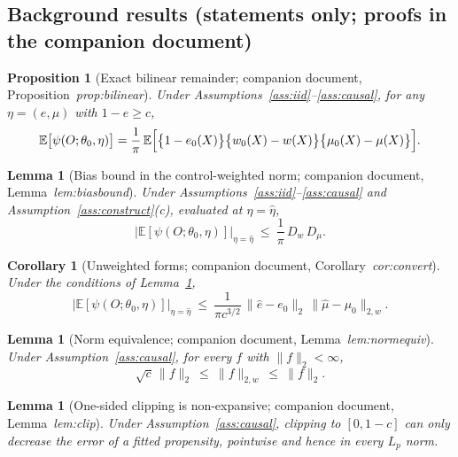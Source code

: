 \documentclass[11pt]{article}
\theoremstyle{plain}
\newtheorem{lemma}[theorem]{Lemma}
\newtheorem{proposition}[theorem]{Proposition}
\newtheorem{corollary}[theorem]{Corollary}
\theoremstyle{definition}
\theoremstyle{remark}
\newcommand{\E}{\mathbb{E}}
\newcommand{\ez}{e_0}
\newcommand{\mz}{\mu_0}
\newcommand{\wz}{w_0}
\newcommand{\ehat}{\widehat{e}}
\newcommand{\mhat}{\widehat{\mu}}
\newcommand{\Dw}{D_w}
\newcommand{\Dm}{D_\mu}
\newcommand{\Ltwo}[1]{\lVert #1 \rVert_{2}}
\newcommand{\Lw}[1]{\lVert #1 \rVert_{2,w}}
\begin{document}
\subsection{Background results (statements only; proofs in the companion document)}\label{sec:background-results}

\begin{proposition}[Exact bilinear remainder; companion document,
Proposition~\emph{prop:bilinear}]\label{prop:bilinear}
Under Assumptions~\ref{ass:iid}--\ref{ass:causal}, for any $\eta=(e,\mu)$
with $1-e\ge c$,
\begin{equation}\label{eq:bilinear}
  \E\bigl[\psi(O;\theta_0,\eta)\bigr]
  =\frac1\pi\,\E\Bigl[\bigl\{1-\ez(X)\bigr\}
   \bigl\{\wz(X)-w(X)\bigr\}\bigl\{\mz(X)-\mu(X)\bigr\}\Bigr].
\end{equation}
\end{proposition}

\begin{lemma}[Bias bound in the control-weighted norm; companion document,
Lemma~\emph{lem:biasbound}]\label{lem:biasbound}
Under Assumptions~\ref{ass:iid}--\ref{ass:causal} and
Assumption~\ref{ass:construct}(c), evaluated at $\eta=\widehat\eta$,
\[
  \bigl\lvert\E[\psi(O;\theta_0,\eta)]\bigr\rvert_{\eta=\widehat\eta}
  \ \le\ \frac1\pi\,\Dw\,\Dm .
\]
\end{lemma}

\begin{corollary}[Unweighted forms; companion document,
Corollary~\emph{cor:convert}]\label{cor:convert}
Under the conditions of Lemma~\ref{lem:biasbound},
\begin{equation}\label{eq:convert}
  \bigl\lvert\E[\psi(O;\theta_0,\eta)]\bigr\rvert_{\eta=\widehat\eta}
  \ \le\ \frac1{\pi c^{3/2}}\,\Ltwo{\ehat-\ez}\,\Lw{\mhat-\mz}.
\end{equation}
\end{corollary}

\begin{lemma}[Norm equivalence; companion document, Lemma~\emph{lem:normequiv}]
\label{lem:normequiv}
Under Assumption~\ref{ass:causal}, for every $f$ with $\Ltwo f<\infty$,
\[
  \sqrt c\,\Ltwo f\ \le\ \Lw f\ \le\ \Ltwo f .
\]
\end{lemma}

\begin{lemma}[One-sided clipping is non-expansive; companion document,
Lemma~\emph{lem:clip}]\label{lem:clip}
Under Assumption~\ref{ass:causal}, clipping to $[0,1-c]$ can only decrease
the error of a fitted propensity, pointwise and hence in every $L_p$ norm.
\end{lemma}
\end{document}
